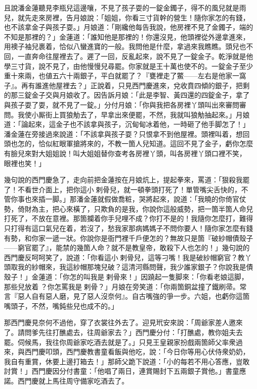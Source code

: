 且說潘金蓮聽見李瓶兒這邊嚷，不見了孩子耍的一錠金鐲子，得不的風兒就是雨兒，就先走來房裡，告月娘說：「姐姐，你看三寸貨幹的營生！隨你家怎的有錢，也不該拿金子與孩子耍。」月娘道：「剛纔他每告我說，他房裡不見了金鐲子，端的不知是那裡的？」金蓮道：「誰知他是那裡的！你還沒見，他頭裡從外邊拿進來，用襖子袖兒裹着，恰似八蠻進寶的一般。{}我問他是什麼，拿過來我瞧瞧。頭兒也不回，一直奔命往屋裡去了。遲了一回，反亂起來，說不見了一錠金子。乾淨就是他學三寸貨，說不見了，由他慢慢兒尋罷。你家就是王十萬也使不的。一錠金子至少重十來兩，也値五六十兩銀子，平白就罷了？『甕裡走了鱉——左右是他家一窩子』。再有誰進他屋裡去？」正說着，只見西門慶進來，兌收賁四傾的銀子，把剩的那三錠金子交與月娘收了。因告訴月娘：「此是李智、黃四還的四錠金子，拿了與孩子耍了耍，就不見了一錠。」分付月娘：「你與我把各房裡丫頭叫出來審問審問。我使小厮街上買狼觔去了，早拿出來便罷，不然，我就叫狼觔抽起來。」{}月娘道：「論起來，這金子也不該拿與孩子，沉甸甸冰着他，一時砸了他手脚怎了！」潘金蓮在旁接過來說道：{}「不該拿與孩子耍？只恨拿不到他屋裡。頭裡叫着，想回頭也怎的，恰似紅眼軍搶將來的，不教一箇人兒知道。這回不見了金子，虧你怎麼有臉兒來對大姐姐說！叫大姐姐替你查考各房裡丫頭，叫各房裡丫頭口裡不笑，𣭈眼裡也笑！」

幾句說的西門慶急了，走向前把金蓮按在月娘炕上，提起拳來，罵道：「狠殺我罷了！不看世介面上，把你這小𢱉剌骨兒，就一頓拳頭打死了！單管嘴尖舌快的，不管你事也來插一脚。」那潘金蓮就假做喬粧，哭將起來，說道：「我曉的你倚官仗勢，倚財為主，把心來橫了，只欺負的是我，你說你這般威勢，把一箇半箇人命兒打死了，不放在意裡。那箇攔着你手兒哩不成？你打不是的！我隨你怎麼打，難得只打得有這口氣兒在着，若沒了，愁我家那病媽媽子不問你要人！隨你家怎麼有錢有勢，和你家一遞一狀。你說你是衙門裡千戶便怎的？無故只是箇『破紗帽債殼子——窮官罷了』，能禁的幾箇人命？就不是教皇帝，敢殺下人也怎的！」{}幾句說的西門慶反呵呵笑了，說道：「你看這小𢱉剌骨兒，這等刁嘴！我是破紗帽窮官？教丫頭取我的紗帽來，我這紗帽那塊兒破？這清河縣問聲，我少誰家銀子？你說我是債殼子！」金蓮道：「你怎的叫我是𢱉剌骨來！」因蹺起一隻脚來：「你看老娘這脚，那些兒放着𢱉？你怎罵我是𢱉剌骨？」月娘在旁笑道：「你兩箇銅盆撞了鐵刷帚。常言『惡人自有惡人磨，見了惡人沒奈何』。自古嘴強的爭一步。六姐，也虧你這箇嘴頭子，不然，嘴鈍些兒也成不的。」

那西門慶見奈何不過他，穿了衣裳往外去了。迎見玳安來說：「周爺家差人邀來了。請問爹先往打醮處去，往周爺家去？」西門慶分付：「打醮處，教你姐夫去罷。伺候馬，我往你周爺家吃酒去就是了。」只見王皇親家扮戲兩箇師父率衆過來，與西門慶叩頭，西門慶教書童看飯與他吃，說：「今日你等用心伏侍衆奶奶，我自有重賞，休要上邊打箱去！」那師父跪下說道：「小的每若不用心答應，豈敢討賞！」西門慶因分付書童：「他唱了兩日，連賞賜封下五兩銀子賞他。」書童應諾。西門慶就上馬往周守備家吃酒去了。

